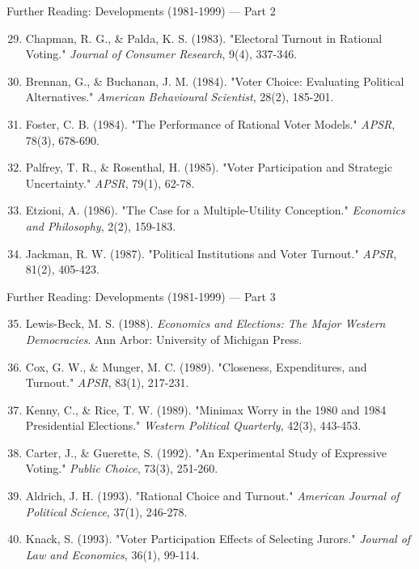 \documentclass[10pt]{beamer}
\begin{document}
\begin{frame}{Further Reading: Developments (1981-1999) — Part 2}
\footnotesize
\begin{enumerate}
\setcounter{enumi}{28}
\item Chapman, R. G., \& Palda, K. S. (1983). "Electoral Turnout in Rational Voting." \emph{Journal of Consumer Research}, 9(4), 337-346.
\item Brennan, G., \& Buchanan, J. M. (1984). "Voter Choice: Evaluating Political Alternatives." \emph{American Behavioural Scientist}, 28(2), 185-201.
\item Foster, C. B. (1984). "The Performance of Rational Voter Models." \emph{APSR}, 78(3), 678-690.
\item Palfrey, T. R., \& Rosenthal, H. (1985). "Voter Participation and Strategic Uncertainty." \emph{APSR}, 79(1), 62-78.
\item Etzioni, A. (1986). "The Case for a Multiple-Utility Conception." \emph{Economics and Philosophy}, 2(2), 159-183.
\item Jackman, R. W. (1987). "Political Institutions and Voter Turnout." \emph{APSR}, 81(2), 405-423.
\end{enumerate}
\end{frame}

\begin{frame}{Further Reading: Developments (1981-1999) — Part 3}
\footnotesize
\begin{enumerate}
\setcounter{enumi}{34}
\item Lewis-Beck, M. S. (1988). \emph{Economics and Elections: The Major Western Democracies}. Ann Arbor: University of Michigan Press.
\item Cox, G. W., \& Munger, M. C. (1989). "Closeness, Expenditures, and Turnout." \emph{APSR}, 83(1), 217-231.
\item Kenny, C., \& Rice, T. W. (1989). "Minimax Worry in the 1980 and 1984 Presidential Elections." \emph{Western Political Quarterly}, 42(3), 443-453.
\item Carter, J., \& Guerette, S. (1992). "An Experimental Study of Expressive Voting." \emph{Public Choice}, 73(3), 251-260.
\item Aldrich, J. H. (1993). "Rational Choice and Turnout." \emph{American Journal of Political Science}, 37(1), 246-278.
\item Knack, S. (1993). "Voter Participation Effects of Selecting Jurors." \emph{Journal of Law and Economics}, 36(1), 99-114.
\end{enumerate}
\end{frame}
\end{document}

